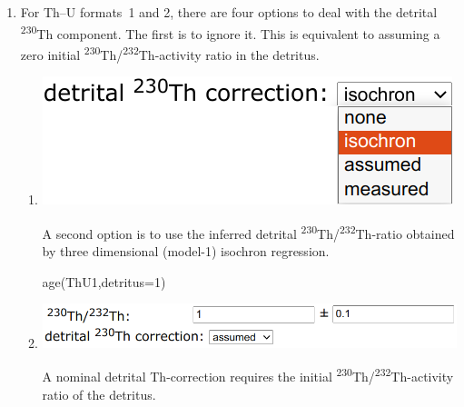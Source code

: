 \begin{refsection}
\begin{enumerate}

\item For Th--U formats~1 and 2, there are four options to deal with
  the detrital \textsuperscript{230}Th component. The first is to
  ignore it. This is equivalent to assuming a zero initial
  \textsuperscript{230}Th/\textsuperscript{232}Th-activity ratio in
  the detritus.

  \begin{enumerate}
  
  \item \begin{minipage}[t]{.4\linewidth}
    \strut\vspace*{-\baselineskip}\newline
    \includegraphics[width=\linewidth]{../figures/ThUdetritalisochroncorr.png}
  \end{minipage}
    \begin{minipage}[t]{.6\linewidth}
      A second option is to use the inferred detrital
      \textsuperscript{230}Th/\textsuperscript{232}Th-ratio obtained
      by three dimensional (model-1) isochron regression.
    \end{minipage}

\begin{console}
age(ThU1,detritus=1)
\end{console}

\item \begin{minipage}[t]{.7\linewidth}
    \strut\vspace*{-\baselineskip}\newline
    \includegraphics[width=\linewidth]{../figures/ThUinitialThassumed.png}
  \end{minipage}
    \begin{minipage}[t]{.3\linewidth}
      A nominal detrital Th-correction requires the initial
      \textsuperscript{230}Th/\textsuperscript{232}Th-activity ratio
      of the detritus.\\
    \end{minipage}


\end{enumerate}
\end{enumerate}
\end{refsection}
